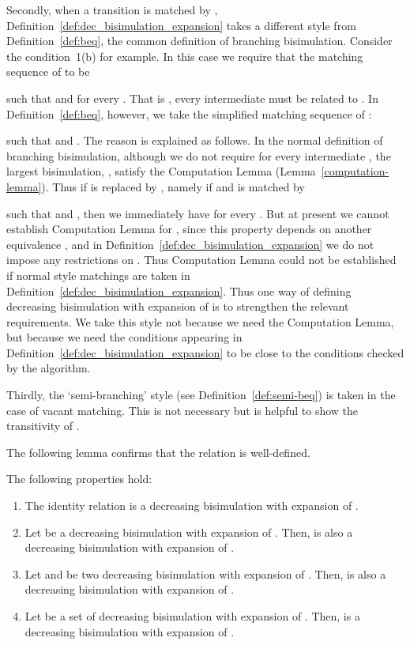 \documentclass{llncs}
\begin{document}
Secondly, when a transition  is matched by , Definition~\ref{def:dec_bisimulation_expansion} takes a different style from Definition~\ref{def:beq}, the common definition of branching bisimulation.  Consider the condition~1(b) for example. In this case we require that the matching sequence of  to be

such that   and  for every .  That is , every intermediate  must be related to .  In Definition~\ref{def:beq}, however, we take the simplified matching sequence of :

such that   and .  The reason is explained as follows.  In the normal definition of branching bisimulation, although we do not require  for every intermediate , the largest bisimulation, , satisfy the Computation Lemma (Lemma~\ref{computation-lemma}). Thus if  is replaced by , namely if  and  is matched by

such that   and , then we immediately have  for every .  But at present we cannot establish Computation Lemma for , since this property depends on another equivalence , and in Definition~\ref{def:dec_bisimulation_expansion} we do not impose any restrictions on . Thus Computation Lemma could not be established if normal style matchings are taken in Definition~\ref{def:dec_bisimulation_expansion}.  Thus one way of defining decreasing bisimulation with expansion of  is to strengthen the relevant requirements.  We take this style not because we need the Computation Lemma, but because we need the conditions appearing in Definition~\ref{def:dec_bisimulation_expansion} to be close to the conditions checked by the algorithm.

Thirdly, the `semi-branching' style (see Definition~\ref{def:semi-beq}) is taken in the case of vacant matching. This is not necessary but is helpful to show the transitivity of .


The following lemma confirms that the relation  is well-defined.

\begin{lemma}\label{lem:property_decreasing_bisimulation_expansion}
The following properties hold:
\begin{enumerate}
\item
The identity relation is a decreasing bisimulation with expansion of .

\item
Let  be a decreasing bisimulation with expansion of . Then,  is also a decreasing  bisimulation with expansion of .

\item
Let  and  be two decreasing  bisimulation with expansion of . Then,   is also a decreasing  bisimulation with expansion of .

\item
Let  be a set of  decreasing  bisimulation with expansion of . Then,  is a decreasing  bisimulation with expansion of .
\end{enumerate}
\end{lemma}
\end{document}
